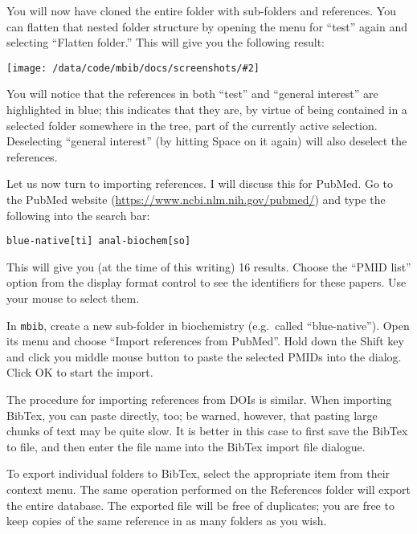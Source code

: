 \documentclass[10pt]{article}
\newcommand*{\mbib}{\texttt{mbib}\xspace}
\newcommand{\screenshot}[2][]{%
\begin{center}
\texttt{[image: /data/code/mbib/docs/screenshots/\#2]}
\end{center}}
\begin{document}
You will now have cloned the entire folder with sub-folders and references. You can flatten that nested folder structure by opening the menu for ``test'' again and selecting ``Flatten folder.'' This will give you the following result:

\screenshot{flatten-folder}

\noindent You will notice that the references in both ``test'' and ``general interest'' are highlighted in blue; this indicates that they are, by virtue of being contained in a selected folder somewhere in the tree, part of the currently active selection. Deselecting ``general interest'' (by hitting Space on it again) will also deselect the references. 

Let us now turn to importing references. I will discuss this for PubMed. Go to the PubMed website (\url{https://www.ncbi.nlm.nih.gov/pubmed/}) and type the following into the search bar:

\begin{verbatim}
blue-native[ti] anal-biochem[so]
\end{verbatim}

This will give you (at the time of this writing) 16 results. Choose the ``PMID list'' option from the display format control to see the identifiers for these papers. Use your mouse to select them. 

In \mbib, create a new sub-folder in biochemistry (e.g.\ called ``blue-native''). Open its menu and choose ``Import references from PubMed''. Hold down the Shift key and click you middle mouse button to paste the selected PMIDs into the dialog. Click OK to start the import. 

The procedure for importing references from DOIs is similar. When importing BibTex, you can paste directly, too; be warned, however, that pasting large chunks of text may be quite slow. It is better in this case to first save the BibTex to file, and then enter the file name into the BibTex import file dialogue. 

To export individual folders to BibTex, select the appropriate item from their context menu. The same operation performed on the References folder will export the entire database. The exported file will be free of duplicates; you are free to keep copies of the same reference in as many folders as you wish. 
\end{document}
